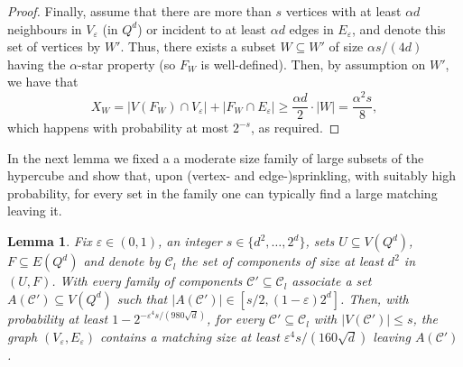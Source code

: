 \documentclass{article}
\newtheorem{lemma}[thm]{Lemma}
\theoremstyle{definition}
\newcommand{\eps}{\varepsilon}
\newcommand{\cC}{\mathcal{C}}
\begin{document}
\begin{proof}
    Finally, assume that there are more than $s$ vertices with at least $\alpha d$ neighbours in $V_\eps$ (in $Q^d$) or incident to at least $\alpha d$ edges in $E_{\eps}$, and denote this set of vertices by $W'$. 
    Thus, there exists a subset $W\subseteq W'$ of size $\alpha s/(4d)$ having the $\alpha$-star property (so $F_W$ is well-defined). Then, by assumption on $W'$, we have that 
    $$X_W=|V(F_W)\cap V_{\eps}|+|F_W\cap E_{\eps}|\ge \frac{\alpha d}{2}\cdot |W|=\frac{\alpha^2s}{8},$$ which happens with probability at most $2^{-s}$, as required.
\end{proof}


In the next lemma we fixed a a moderate size family of large subsets of the hypercube and 
show that, upon (vertex- and edge-)sprinkling, with suitably high probability, for every set in the family one can typically find a large matching leaving it.


\begin{lemma}\label{lem: expanding matching}
Fix $\eps\in (0,1)$, an integer $s\in \{d^2,\ldots,2^d\}$, sets $U\subseteq V(Q^d)$, $F\subseteq E(Q^d)$ and denote by $\cC_l$ the set of components of size at least $d^2$ in $(U,F)$. With every family of components $\cC'\subseteq \cC_l$ associate a set $A(\cC')\subseteq V(Q^d)$ such that $|A(\cC')|\in [s/2,(1-\eps)2^d]$. 
Then, with probability at least $1-2^{-\eps^4s/(980\sqrt{d})}$, for every $\cC'\subseteq \cC_l$ with $|V(\cC')|\le s$, the graph $(V_{\eps},E_{\eps})$ contains a matching size at least $\eps^4s/(160\sqrt{d})$ leaving $A(\cC')$.
\end{lemma} 
\end{document}
